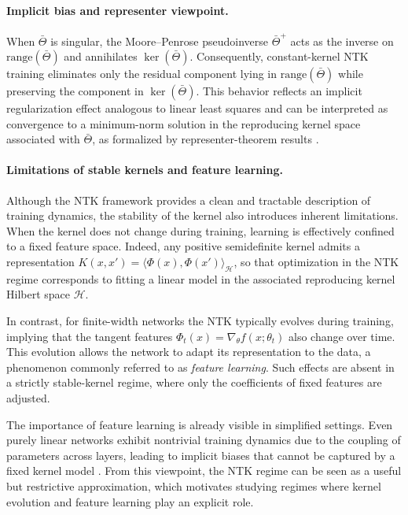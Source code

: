 \paragraph{Implicit bias and representer viewpoint.}
When $\bar\Theta$ is singular, the Moore--Penrose pseudoinverse $\bar\Theta^+$
acts as the inverse on $\mathrm{range}(\bar\Theta)$ and annihilates
$\ker(\bar\Theta)$. Consequently, constant-kernel NTK training eliminates only
the residual component lying in $\mathrm{range}(\bar\Theta)$ while preserving
the component in $\ker(\bar\Theta)$. This behavior reflects an implicit
regularization effect analogous to linear least squares and can be interpreted
as convergence to a minimum-norm solution in the reproducing kernel space
associated with $\bar\Theta$, as formalized by representer-theorem results
\citep{bietti2019inductivebiasneuraltangent,
	bartolucci2021understandingneuralnetworksreproducing}.

\paragraph{Limitations of stable kernels and feature learning.}
Although the NTK framework provides a clean and tractable description of
training dynamics, the stability of the kernel also introduces inherent
limitations. When the kernel does not change during training, learning is
effectively confined to a fixed feature space. Indeed, any positive
semidefinite kernel admits a representation
$K(x,x')=\langle \Phi(x),\Phi(x')\rangle_{\mathcal H}$, so that optimization in
the NTK regime corresponds to fitting a linear model in the associated
reproducing kernel Hilbert space $\mathcal H$.

In contrast, for finite-width networks the NTK typically evolves during
training, implying that the tangent features
$\Phi_t(x)=\nabla_\theta f(x;\theta_t)$ also change over time. This evolution
allows the network to adapt its representation to the data, a phenomenon
commonly referred to as \emph{feature learning}. Such effects are absent in a
strictly stable-kernel regime, where only the coefficients of fixed features
are adjusted.

The importance of feature learning is already visible in simplified settings.
Even purely linear networks exhibit nontrivial training dynamics due to the
coupling of parameters across layers, leading to implicit biases that cannot
be captured by a fixed kernel model
\citep{saxe2014exactsolutionsnonlineardynamics, tu2024mixeddynamicslinearnetworks}.
From this viewpoint, the NTK regime can be seen as a useful but restrictive
approximation, which motivates studying regimes where kernel evolution and
feature learning play an explicit role.

